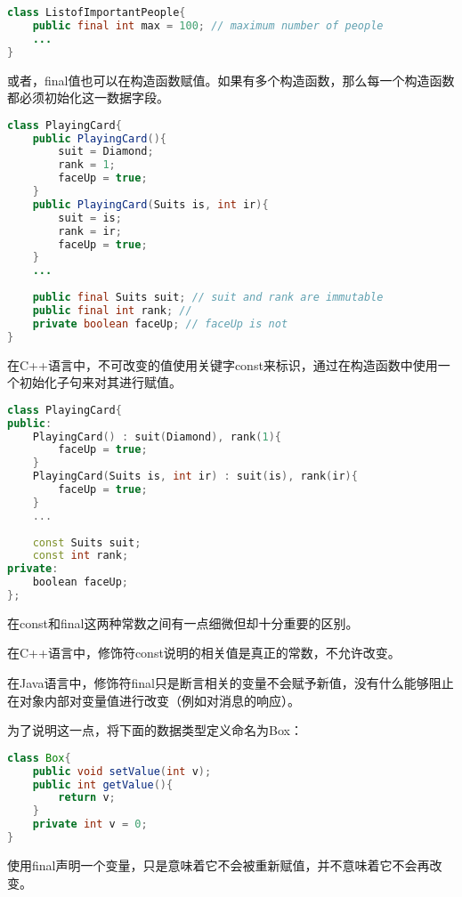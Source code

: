 \begin{lstlisting}[language=Java]
class ListofImportantPeople{
	public final int max = 100; // maximum number of people
	...
}
\end{lstlisting}

或者，final值也可以在构造函数赋值。如果有多个构造函数，那么每一个构造函数都必须初始化这一数据字段。



\begin{lstlisting}[language=Java]
class PlayingCard{
	public PlayingCard(){
		suit = Diamond;
		rank = 1;
		faceUp = true;
	}
	public PlayingCard(Suits is, int ir){
		suit = is;
		rank = ir;
		faceUp = true;
	}
	...
	
	public final Suits suit; // suit and rank are immutable
	public final int rank; // 
	private boolean faceUp; // faceUp is not
}
\end{lstlisting}

在C++语言中，不可改变的值使用关键字const来标识，通过在构造函数中使用一个初始化子句来对其进行赋值。


\begin{lstlisting}[language=C++]
class PlayingCard{
public:
	PlayingCard() : suit(Diamond), rank(1){
		faceUp = true;
	}
	PlayingCard(Suits is, int ir) : suit(is), rank(ir){
		faceUp = true;
	}
	...
	
	const Suits suit;
	const int rank;
private:
	boolean faceUp;
};
\end{lstlisting}

在const和final这两种常数之间有一点细微但却十分重要的区别。

\begin{compactitem}
\item 在C++语言中，修饰符const说明的相关值是真正的常数，不允许改变。
\item 在Java语言中，修饰符final只是断言相关的变量不会赋予新值，没有什么能够阻止在对象内部对变量值进行改变（例如对消息的响应）。
\end{compactitem}

为了说明这一点，将下面的数据类型定义命名为Box：

\begin{lstlisting}[language=Java]
class Box{
	public void setValue(int v);
	public int getValue(){
		return v;
	}
	private int v = 0;
}
\end{lstlisting}

使用final声明一个变量，只是意味着它不会被重新赋值，并不意味着它不会再改变。



